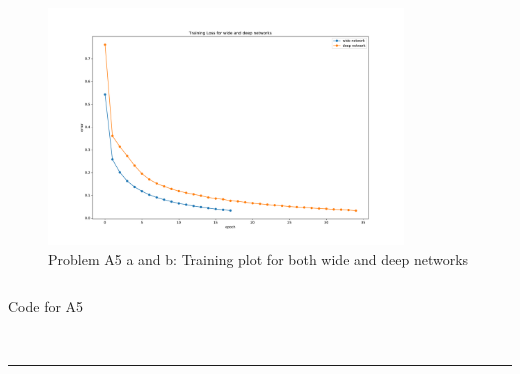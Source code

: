 \documentclass{article}
\newcommand{\1}{\mathbf{1}}
\begin{document}
\begin{enumerate}
\begin{figure}[h!]
    \centering
    \includegraphics[width=0.84\textwidth]{hw3/code/figures/A5_training_plots.pdf}
    \caption{Problem A5 a and b: Training plot for both wide and deep networks}
\end{figure}
\end{enumerate}   
\inputminted{python}{code/A5.py}
\caption{Code for A5}\\
\noindent\rule{\textwidth}{1pt}
\end{document}

